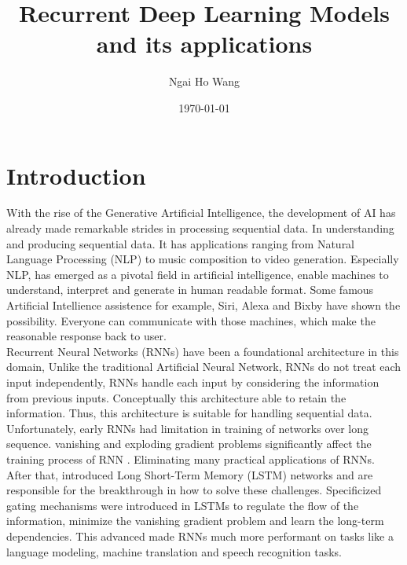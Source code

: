 \documentclass[12pt,a4paper]{article}
\title{Recurrent Deep Learning Models and its applications}
\author{Ngai Ho Wang}
\date{\today}
\begin{document}
\maketitle

\tableofcontents %


\section{Introduction}

With the rise of the Generative Artificial Intelligence, the development of AI has already made remarkable strides in processing sequential data. In understanding and producing sequential data. It has applications ranging from Natural Language Processing (NLP) to music composition to video generation. Especially NLP, has emerged as a pivotal field in artificial intelligence, enable machines to understand, interpret and generate in human readable format. Some famous Artificial Intellience assistence for example, Siri, Alexa and Bixby have shown the possibility. Everyone can communicate with those machines, which make the reasonable response back to user.\\[1ex]
Recurrent Neural Networks (RNNs) have been a foundational architecture in this domain, Unlike the traditional Artificial Neural Network, RNNs do not treat each input independently, RNNs handle each input by considering the information from previous inputs. Conceptually this architecture able to retain the information. Thus, this architecture is suitable for handling sequential data. Unfortunately, early RNNs had limitation in training of networks over long sequence. vanishing and exploding gradient problems significantly affect the training process of RNN \parencite{bengio1994learning}. Eliminating many practical applications of RNNs. After that, \parencite{hochreiter1997lstm} introduced Long Short-Term Memory (LSTM) networks and are responsible for the breakthrough in how to solve these challenges. Specificized gating mechanisms were introduced in LSTMs to regulate the flow of the information, minimize the vanishing gradient problem and learn the long-term dependencies. This advanced made RNNs much more performant on tasks like a language modeling, machine translation and speech recognition tasks.\\[1ex]
\end{document}
